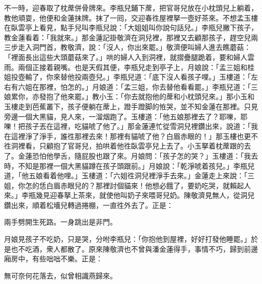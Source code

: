 不一時，迎春取了枕蓆併骨牌來。李瓶兒鋪下蓆，把官哥兒放在小枕頭兒上躺着，教他頑耍，他便和金蓮抹牌。抹了一囘，交迎春徃屋裡拏一壺好茶來。不想孟玉樓在臥雲亭上看見，點手兒叫李瓶兒說：「大姐姐叫你說句話兒。」李瓶兒撇下孩子，教金蓮看着：{}「我就來。」那金蓮記掛敬濟在洞兒裡，那裡又去顧那孩子，趕空兒兩三步走入洞門首，教敬濟，說：「沒人，你出來罷。」敬濟便叫婦人進去瞧蘑菇：「裡面長出這些大頭蘑菇來了。」哄的婦人入到洞裡，就摺疊腿跪着，要和婦人雲雨。兩個正接着親嘴。也是天假其便，李瓶兒走到亭子上，月娘說：「孟三姐和桂姐投壺輸了，你來替他投兩壺兒。」李瓶兒道：「底下沒人看孩子哩。」玉樓道：「左右有六姐在那裡，怕怎的。」月娘道：「孟三姐，你去替他看看罷。」{}李瓶兒道：「三娘累你，亦發抱了他來罷。」{}教小玉：「你去就抱他的蓆和小枕頭兒來。」那小玉和玉樓走到芭蕉叢下，孩子便躺在蓆上，蹬手蹬脚的恠哭，並不知金蓮在那裡。只見旁邊一個大黑貓，見人來，一溜烟跑了。玉樓道：「他五娘那裡去了？耶嚛，耶嚛！把孩子丟在這裡，吃貓唬了他了。」那金蓮連忙從雪洞兒裡鑽出來，說道：「我在這裡淨了淨手，誰徃那裡去來！那裡有貓唬了他？白眉赤眼的！」那玉樓也更不徃洞裡看，只顧抱了官哥兒，拍哄着他徃臥雲亭兒上去了。小玉拏着枕蓆跟的去了。金蓮恐怕他學舌，隨屁股也跟了來。{}月娘問：「孩子怎的哭？」玉樓道：「我去時，不知是那裡一個大黑貓蹲在孩子頭跟前。」月娘說：「乾淨唬着孩兒。」李瓶兒道，「他五娘看着他哩。」玉樓道：「六姐徃洞兒裡淨手去來。」金蓮走上來說：「三姐，你怎的恁白眉赤眼兒的？那裡討個貓來！他想必餓了，要奶吃哭，就賴起人來。」{}李瓶幾見迎春拏上茶來，就使他叫奶子來喂哥兒奶。陳敬濟見無人，從洞兒鑽出來，順着松墻兒轉過捲棚，一直徃外去了。正是：

\begin{myquote}
兩手劈開生死路。一身跳出是非門。
\end{myquote}

月娘見孩子不吃奶，只是哭，分咐李瓶兒：「你抱他到屋裡，好好打發他睡罷。」於是也不吃酒，衆人都散了。原來陳敬濟也不曾與潘金蓮得手，事情不巧，歸到前邊廂房中，有些咄咄不樂。正是：

\begin{myquote}
無可奈何花落去，似曾相識燕歸來。
\end{myquote}

